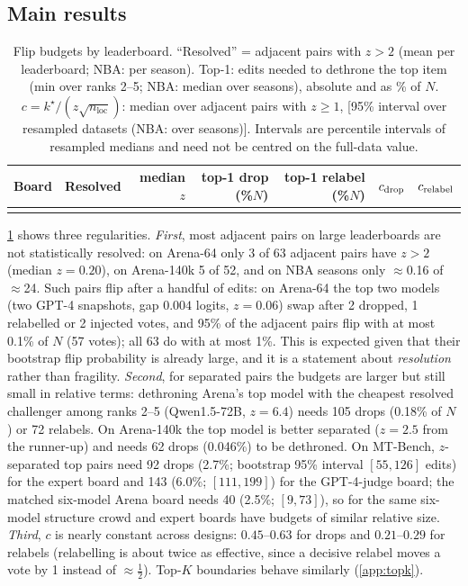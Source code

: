 \documentclass{article}
\theoremstyle{plain}
\theoremstyle{remark}
\newcommand{\nloc}{n_{\mathrm{loc}}}
\newcommand{\kstar}{k^\star}
\begin{document}
\subsection{Main results}
\begin{table}[t]
\caption{Flip budgets by leaderboard. ``Resolved'' = adjacent pairs with $z>2$ (mean per leaderboard; NBA: per season). Top-1: edits needed to dethrone the top item (min over ranks 2--5; NBA: median over seasons), absolute and as \% of $N$. $c=\kstar/(z\sqrt{\nloc})$: median over adjacent pairs with $z\ge1$, [95\% interval over resampled datasets (NBA: over seasons)]. Intervals are percentile intervals of resampled medians and need not be centred on the full-data value.}\label{tab:main}
\centering\small
\begin{tabular}{lrrrrrr}
\toprule
Board & Resolved & median $z$ & top-1 drop (\%$N$) & top-1 relabel (\%$N$) & $c_{\rm drop}$ & $c_{\rm relabel}$\\
\midrule
\\
\bottomrule
\end{tabular}
\end{table}
\cref{tab:main} shows three regularities. \emph{First}, most adjacent pairs on large leaderboards are not statistically resolved: on Arena-64 only 3 of 63 adjacent pairs have $z>2$ (median $z=0.20$), on Arena-140k 5 of 52, and on NBA seasons only $\approx$0.16 of $\approx$24. Such pairs flip after a handful of edits: on Arena-64 the top two models (two GPT-4 snapshots, gap $0.004$ logits, $z=0.06$) swap after 2 dropped, 1 relabelled or 2 injected votes, and 95\% of the adjacent pairs flip with at most 0.1\% of $N$ (57 votes); all 63 do with at most 1\%. This is expected given that their bootstrap flip probability is already large, and it is a statement about \emph{resolution} rather than fragility. \emph{Second}, for separated pairs the budgets are larger but still small in relative terms: dethroning Arena's top model with the cheapest resolved challenger among ranks 2--5 (Qwen1.5-72B, $z=6.4$) needs 105 drops (0.18\% of $N$) or 72 relabels. On Arena-140k the top model is better separated ($z=2.5$ from the runner-up) and needs 62 drops (0.046\%) to be dethroned. On MT-Bench, $z$-separated top pairs need 92 drops (2.7\%; bootstrap 95\% interval $[55,126]$ edits) for the expert board and 143 (6.0\%; $[111,199]$) for the GPT-4-judge board; the matched six-model Arena board needs 40 (2.5\%; $[9,73]$), so for the same six-model structure crowd and expert boards have budgets of similar relative size. \emph{Third}, $c$ is nearly constant across designs: $0.45$--$0.63$ for drops and $0.21$--$0.29$ for relabels (relabelling is about twice as effective, since a decisive relabel moves a vote by 1 instead of $\approx\tfrac12$). Top-$K$ boundaries behave similarly (\cref{app:topk}).
\end{document}
